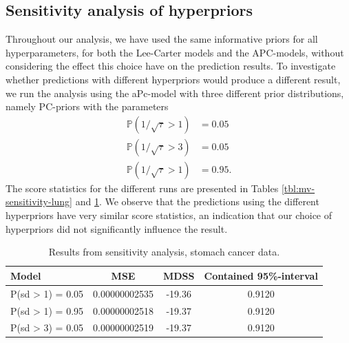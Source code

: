 \subsection{Sensitivity analysis of hyperpriors}
Throughout our analysis, we have used the same informative priors for all hyperparameters, for both the Lee-Carter models and the APC-models, without considering the effect this choice have on the prediction results. To investigate whether predictions with different hyperpriors would produce a different result, we run the analysis using the aPc-model with three different prior distributions, namely PC-priors with the parameters
\begin{equation}
    \begin{aligned}
        \mathbb{P}(1/\sqrt{\tau} > 1) & = 0.05 \\
        \mathbb{P}(1/\sqrt{\tau} > 3) & = 0.05 \\
        \mathbb{P}(1/\sqrt{\tau} > 1) & = 0.95.
    \end{aligned}
\end{equation}
The score statistics for the different runs are presented in Tables \ref{tbl:mv-sensitivity-lung} and \ref{tbl:mv-sensitivity-stomach}. We observe that the predictions using the different hyperpriors have very similar score statistics, an indication that our choice of hyperpriors did not significantly influence the result. 


\begin{table}
    \begin{center}
        \begin{tabular}{l |c c c }
        Model & MSE &   MDSS & Contained 95\%-interval\\
        \hline
        P(sd > 1) = 0.05 & 0.00000002535 & -19.36    & 0.9120\\
        P(sd > 1) = 0.95 & 0.00000002518 & -19.37    & 0.9120\\
        P(sd > 3) = 0.05 & 0.00000002519 & -19.37    & 0.9120\\
        \end{tabular}
    \caption{Results from sensitivity analysis, stomach cancer data.}\label{tbl:mv-sensitivity-stomach}
    \end{center}
\end{table}

